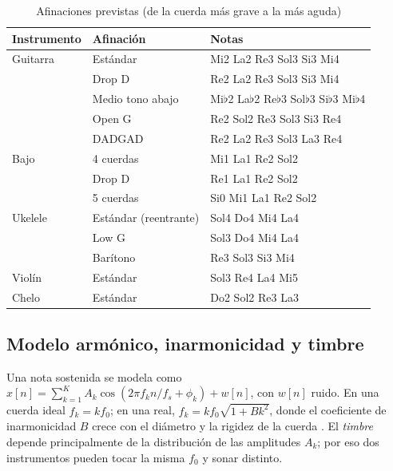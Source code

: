 \documentclass[conference,a4paper]{IEEEtran}
\newcommand{\fo}{f_0}
\begin{document}
\begin{table}[t]
\centering
\caption{Afinaciones previstas (de la cuerda más grave a la más aguda)}
\label{tab:afinaciones}
\footnotesize
\begin{tabular}{@{}lll@{}}
\toprule
Instrumento & Afinación & Notas \\
\midrule
Guitarra & Estándar & Mi2 La2 Re3 Sol3 Si3 Mi4 \\
         & Drop D & Re2 La2 Re3 Sol3 Si3 Mi4 \\
         & Medio tono abajo & Mi$\flat$2 La$\flat$2 Re$\flat$3 Sol$\flat$3 Si$\flat$3 Mi$\flat$4 \\
         & Open G & Re2 Sol2 Re3 Sol3 Si3 Re4 \\
         & DADGAD & Re2 La2 Re3 Sol3 La3 Re4 \\
Bajo     & 4 cuerdas & Mi1 La1 Re2 Sol2 \\
         & Drop D & Re1 La1 Re2 Sol2 \\
         & 5 cuerdas & Si0 Mi1 La1 Re2 Sol2 \\
Ukelele  & Estándar (reentrante) & Sol4 Do4 Mi4 La4 \\
         & Low G & Sol3 Do4 Mi4 La4 \\
         & Barítono & Re3 Sol3 Si3 Mi4 \\
Violín   & Estándar & Sol3 Re4 La4 Mi5 \\
Chelo    & Estándar & Do2 Sol2 Re3 La3 \\
\bottomrule
\end{tabular}
\end{table}

\subsection{Modelo armónico, inarmonicidad y timbre}
Una nota sostenida se modela como $x[n]=\sum_{k=1}^{K}A_k\cos(2\pi f_k n/f_s+\phi_k)+w[n]$, con $w[n]$ ruido. En una cuerda ideal $f_k = k\fo$; en una real, $f_k = k\fo\sqrt{1+Bk^2}$, donde el coeficiente de inarmonicidad $B$ crece con el diámetro y la rigidez de la cuerda \parencite{fletcher1998physics}. El \emph{timbre} depende principalmente de la distribución de las amplitudes $A_k$; por eso dos instrumentos pueden tocar la misma $\fo$ y sonar distinto.
\end{document}
